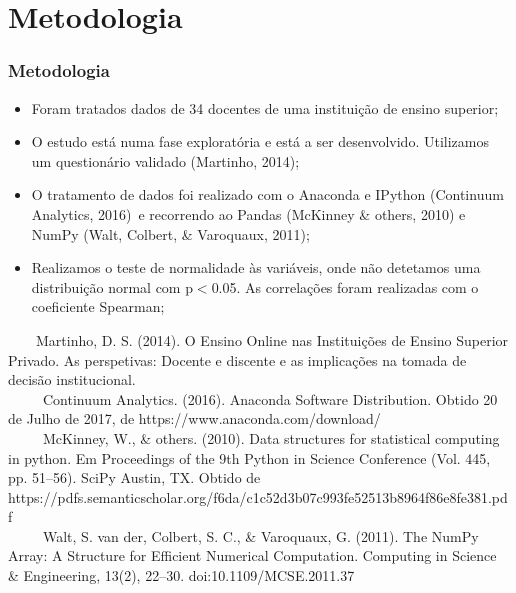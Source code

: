 \documentclass[10pt]{beamer}
\begin{document}
\section{Metodologia}
\begin{comment}
The data was anonymised, removing all personal information before being retrieved from the management system.
Esta investigação, desenvolvida através da técnica de inquérito por questionário, pretende avaliar como é que esses docentes encararam essa realidade. O trabalho de campo foi realizado na primeira quinzena de abril de 2020 envolvendo docentes de uma instituição de ensino superior portuguesa tendo-se obtido 35 respostas válidas.
\end{comment}
\begin{frame}
	\frametitle{Metodologia}
	\begin{itemize}
		\item Foram tratados dados de 34 docentes de uma instituição de ensino superior;
		\item O estudo está numa fase exploratória e está a ser desenvolvido. Utilizamos um questionário validado (Martinho, 2014);
		\item O tratamento de dados foi realizado com o Anaconda e IPython \footnotesize(Continuum Analytics, 2016)\normalsize ~e recorrendo ao Pandas \footnotesize(McKinney \& others, 2010) \normalsize e NumPy \footnotesize(Walt, Colbert, \& Varoquaux, 2011)\normalsize;
		\item Realizamos o teste de normalidade às variáveis, onde não detetamos uma distribuição normal com p$<$0.05. As correlações foram realizadas com o coeficiente Spearman;



	\end{itemize}
	\tiny 
	~~~~Martinho, D. S. (2014). O Ensino Online nas Instituições de Ensino Superior Privado. As perspetivas: Docente e discente e as implicações na tomada de decisão institucional.\\
	~~~~~Continuum Analytics. (2016). Anaconda Software Distribution. Obtido 20 de Julho de 2017, de https://www.anaconda.com/download/ \\
	~~~~~McKinney, W., \& others. (2010). Data structures for statistical computing in python. Em Proceedings of the 9th Python in Science Conference (Vol. 445, pp. 51–56). SciPy Austin, TX. Obtido de https://pdfs.semanticscholar.org/f6da/c1c52d3b07c993fe52513b8964f86e8fe381.pdf\\
	~~~~~Walt, S. van der, Colbert, S. C., \& Varoquaux, G. (2011). The NumPy Array: A Structure for Efficient Numerical Computation. Computing in Science \& Engineering, 13(2), 22–30. doi:10.1109/MCSE.2011.37


\end{frame}
\end{document}

